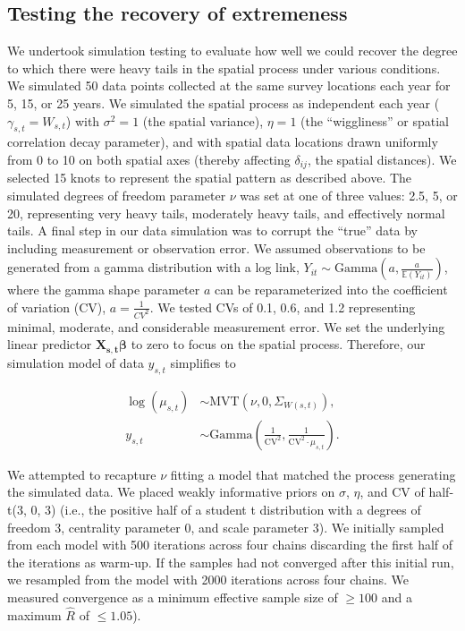 \documentclass[12pt,english]{article}
\begin{document}
\begin{spacing}{1.25}

\subsection{Testing the recovery of extremeness}

We undertook simulation testing to evaluate how well we could recover the degree to
which there were heavy tails in the spatial process under various conditions.
We simulated 50 data points collected at the same survey locations each year
for 5, 15, or 25 years. We simulated the spatial process as independent each
year ($\gamma_{s,t} = W_{s,t}$) with $\sigma^2 = 1$ (the spatial variance),
$\eta = 1$ (the ``wiggliness'' or spatial correlation decay parameter), and
with spatial data locations drawn uniformly from 0 to 10 on both spatial axes
(thereby affecting $\delta_{ij}$, the spatial distances).
We selected 15 knots to represent the spatial pattern as described above.
The simulated degrees of freedom parameter $\nu$ was set at
one of three values: 2.5, 5, or 20, representing very heavy tails, moderately heavy
tails, and effectively normal tails. A final step in our data
simulation was to corrupt the ``true'' data by including measurement or
observation error. We assumed observations to be generated from a gamma
distribution with a log link, $Y_{it}\sim \mathrm{Gamma}\left(a,\frac
  {a}{\mathbb{E}(Y_{it})} \right)$, where the gamma shape parameter $a$ can be
reparameterized into the coefficient of variation (CV), $a=\frac{1}{CV^2}$. We
tested CVs of 0.1, 0.6, and 1.2 representing minimal, moderate, and
considerable measurement error. We set the underlying linear predictor
$\bm{X_{s,t}} \bm{\beta}$ to zero to focus on the spatial process. Therefore,
our simulation model of data $y_{s,t}$ simplifies to

\begin{align}
  \log(\mu_{s,t}) &\sim \mathrm{MVT}\left(\nu, 0, \Sigma_{W(s,t)}\right),\\
  y_{s,t} &\sim \mathrm{Gamma} \left( \frac{1}{\mathrm{CV}^2},
  \frac{1}{\mathrm{CV}^2 \cdot \mu_{s,t} } \right).
\end{align}

We attempted to recapture $\nu$ fitting a model that matched the process
generating the simulated data. We placed weakly informative priors on $\sigma$,
$\eta$, and CV of half-t(3, 0, 3) (i.e., the positive half of a student t
distribution with a degrees of freedom 3, centrality parameter 0, and scale
parameter 3). We initially sampled from each model with 500 iterations across
four chains discarding the first half of the iterations as warm-up. If the
samples had not converged after this initial run, we resampled from the model
with 2000 iterations across four chains. We measured convergence as a minimum
effective sample size of $\ge 100$ and a maximum $\hat{R}$ of $\le 1.05$).


\end{spacing}
\end{document}
